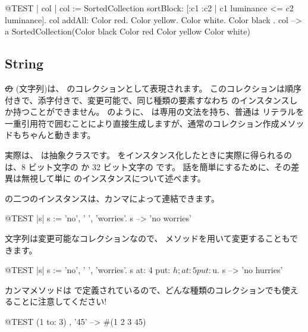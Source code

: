 \documentclass[a4paper,10pt,twoside]{book}
\begin{document}
\begin{code}{@TEST | col |}
col := SortedCollection sortBlock: [:c1 :c2 | c1 luminance <= c2 luminance].
col addAll: { Color red. Color yellow. Color white. Color black }.
col --> a SortedCollection(Color black Color red Color yellow Color white)
\end{code}

\subsection{String}
\st の  (文字列)は、 のコレクションとして表現されます。
このコレクションは順序付きで、添字付きで、変更可能で、同じ種類の要素すなわち  のインスタンスしか持つことができません。
 のように、 は専用の文法を持ち、普通は  リテラルを一重引用符で囲むことにより直接生成しますが、通常のコレクション作成メソッドもちゃんと動きます。


実際は、 は抽象クラスです。
 をインスタンス化したときに実際に得られるのは、8 ビット文字の  か 32 ビット文字の  です。
話を簡単にするために、その差異は無視して単に  のインスタンスについて述べます。

 の二つのインスタンスは、カンマによって連結できます。%
\begin{code}{@TEST |s|}
s := 'no', ' ', 'worries'.
s -->  'no worries'
\end{code}

文字列は変更可能なコレクションなので、 メソッドを用いて変更することもできます。

\begin{code}{@TEST |s| s := 'no', ' ', 'worries'.}
s at: 4 put: $h; at: 5 put: $u.
s --> 'no hurries'
\end{code}

カンマメソッドは  で定義されているので、どんな種類のコレクションでも使えることに注意してください!
\begin{code}{@TEST}
(1 to: 3) , '45' --> #(1 2 3 $4 $5)
\end{code}
\end{document}
